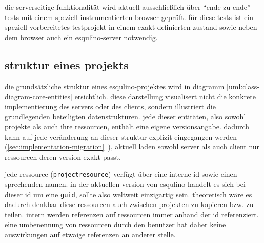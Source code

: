 

die serverseitige funktionalität wird aktuell ausschließlich über "`ende-zu-ende"'-tests mit einem speziell instrumentierten browser geprüft. für diese tests ist ein speziell vorbereitetes testprojekt in einem exakt definierten zustand sowie neben dem browser auch ein esqulino-server notwendig.

\subsection{struktur eines projekts}

die grundsätzliche struktur eines esqulino-projektes wird in diagramm \ref{uml:class-diagram-core-entities} ersichtlich. diese darstellung visualisert nicht die konkrete implementierung des servers oder des clients, sondern illustriert die grundlegenden beteiligten datenstrukturen. jede dieser entitäten, also sowohl projekte als auch ihre ressourcen, enthält eine eigene versionsangabe. dadurch kann auf jede veränderung an dieser struktur explizit eingegangen werden (\ref{sec:implementation-migration}~), aktuell laden sowohl server als auch client nur ressourcen deren version exakt passt.

jede ressource (\lstinline{projectresource}) verfügt über eine interne id sowie einen sprechenden namen. in der aktuellen version von esqulino handelt es sich bei dieser id um eine \lstinline{guid}, sollte also weltweit einzigartig sein. theoretisch wäre es dadurch denkbar diese ressourcen auch zwischen projekten zu kopieren bzw. zu teilen. intern werden referenzen auf ressourcen immer anhand der id referenziert. eine umbenennung von ressourcen durch den benutzer hat daher keine auswirkungen auf etwaige referenzen an anderer stelle.


